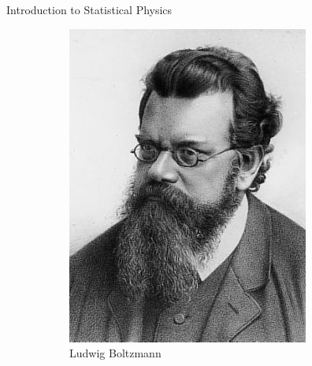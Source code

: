 \documentclass{beamer}
\begin{document}
\begin{frame}{Introduction to Statistical Physics}
  \begin{figure}[h!]
    \centering
    \begin{subfigure}[b]{0.25\linewidth}
      \includegraphics[width=\linewidth]{figures/boltzmann.jpeg}
      \caption{Ludwig Boltzmann~\cite{boltzmann}}
    \end{subfigure}%
    \quad
  \begin{subfigure}[b]{0.25\linewidth}

\end{subfigure}
\end{figure}
\end{frame}
\end{document}
